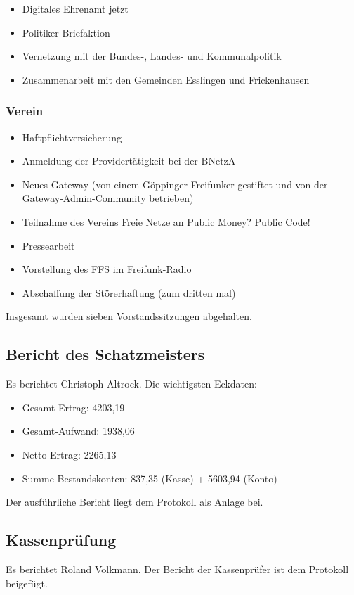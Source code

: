\documentclass[a4paper]{scrartcl}
\begin{document}
\begin{itemize}
\item Digitales Ehrenamt jetzt
\item Politiker Briefaktion
\item Vernetzung mit der Bundes-, Landes- und Kommunalpolitik
\item Zusammenarbeit mit den Gemeinden Esslingen und Frickenhausen
\end{itemize}

\subsubsection{Verein}

\begin{itemize}
\item Haftpflichtversicherung
\item Anmeldung der Providertätigkeit bei der BNetzA
\item Neues Gateway (von einem Göppinger Freifunker gestiftet und von der Gateway-Admin-Community betrieben)
\item Teilnahme des Vereins Freie Netze an Public Money? Public Code!
\item Pressearbeit
\item Vorstellung des FFS im Freifunk-Radio
\item Abschaffung der Störerhaftung (zum dritten mal)
\end{itemize}

Insgesamt wurden sieben Vorstandssitzungen abgehalten.

\subsection{Bericht des Schatzmeisters}
Es berichtet Christoph Altrock. Die wichtigsten Eckdaten:
\begin{itemize}
\item Gesamt-Ertrag: 4203,19 \texteuro
\item Gesamt-Aufwand: 1938,06 \texteuro
\item Netto Ertrag: 2265,13 \texteuro
\item Summe Bestandskonten: 837,35 \texteuro (Kasse) + 5603,94 \texteuro (Konto) 
\end{itemize}
Der ausführliche Bericht liegt dem Protokoll als Anlage bei.
\subsection{Kassenprüfung}
Es berichtet Roland Volkmann. Der Bericht der Kassenprüfer ist dem Protokoll beigefügt.
\end{document}
